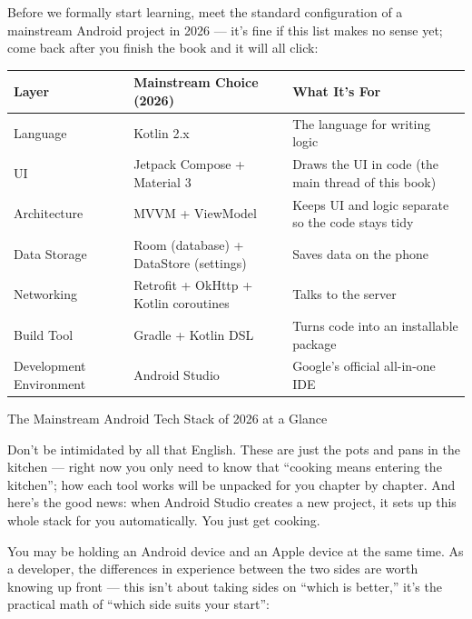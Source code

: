 
Before we formally start learning, meet the standard configuration of a mainstream Android project in 2026 — it's fine if this list makes no sense yet; come back after you finish the book and it will all click:

\begin{center}
\begin{tabularx}{\linewidth}{|X|X|X|}
\hline
\textbf{Layer} & \textbf{Mainstream Choice (2026)} & \textbf{What It's For} \tabularnewline
\hline
Language & Kotlin 2.x & The language for writing logic \tabularnewline
UI & Jetpack Compose + Material 3 & Draws the UI in code (the main thread of this book) \tabularnewline
Architecture & MVVM + ViewModel & Keeps UI and logic separate so the code stays tidy \tabularnewline
Data Storage & Room (database) + DataStore (settings) & Saves data on the phone \tabularnewline
Networking & Retrofit + OkHttp + Kotlin coroutines & Talks to the server \tabularnewline
Build Tool & Gradle + Kotlin DSL & Turns code into an installable package \tabularnewline
Development Environment & Android Studio & Google's official all-in-one IDE \tabularnewline
\hline
\end{tabularx}
\end{center}

\begin{center}\small\color{gray}The Mainstream Android Tech Stack of 2026 at a Glance\end{center}

Don't be intimidated by all that English. These are just the pots and pans in the kitchen — right now you only need to know that “cooking means entering the kitchen”; how each tool works will be unpacked for you chapter by chapter. And here's the good news: when Android Studio creates a new project, it sets up this whole stack for you automatically. You just get cooking.


You may be holding an Android device and an Apple device at the same time. As a developer, the differences in experience between the two sides are worth knowing up front — this isn't about taking sides on “which is better,” it's the practical math of “which side suits your start”:

